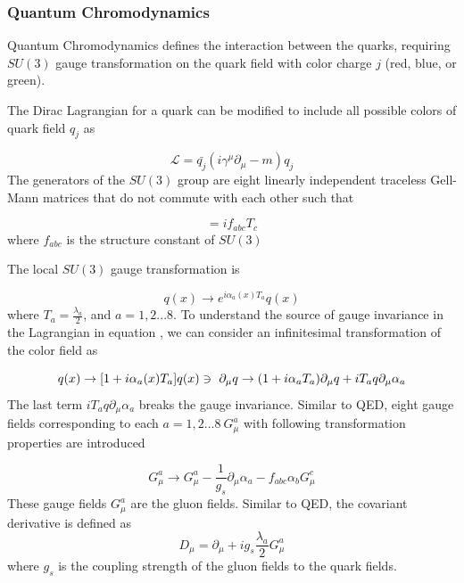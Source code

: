 \subsubsection{Quantum Chromodynamics }
\label{subsubsec:QCD}

Quantum Chromodynamics defines the interaction between the quarks, requiring $SU(3)$ gauge transformation on the quark field with color charge $j$ (red, blue, or green).
 
The Dirac Lagrangian for a quark can be modified to include all possible colors of quark field $q_{j}$ as

\begin{equation}
\mathcal{L} = \bar{q_{j}}(i\gamma^{\mu}\partial_{\mu} - m )q_{j}
\label{eqn:QCDStartL}
\end{equation}
The generators of the $SU(3)$ group are eight linearly independent traceless Gell-Mann matrices that do not commute with each other such that 

\begin{equation}
[ T_{a},T_{b} ] = if_{abc}T_{c}
\label{eqn:SU3GellManMat}
\end{equation}
where $f_{abc}$ is the structure constant of $SU(3)$

The local $SU(3)$ gauge transformation is 

\begin{equation}
q(x) \rightarrow e^{i \alpha_a(x) T_{a}} q(x)
\label{eqn:QCDSU3LT}
\end{equation}
where $T_{a} = \frac{\lambda_{a}}{2}$, and $a = {1,2...8}$. To understand the source of gauge invariance in the Lagrangian in equation \label{eqn:SU3LocalGaugeTransform}, we can consider an infinitesimal transformation of the color field as 

\begin{equation}
q(x) \rightarrow [ 1 + i\alpha_{a}(x)T_{a}]q(x) \\
\ni ~ \partial_{\mu}q \rightarrow ( 1 + i\alpha_{a}T_{a})\partial_{\mu}q + iT_{a}q\partial_{\mu} \alpha_{a}
\end{equation}
The last term $iT_{a}q\partial_{\mu} \alpha_{a}$ breaks the gauge invariance. Similar to QED, eight gauge fields corresponding to each $a = {1,2...8} ~ G_{\mu}^{a}$ with following transformation properties are introduced 

\begin{equation}
G_{\mu}^{a} \rightarrow G_{\mu}^{a} - \frac{1}{g_{s}} \partial_{\mu} \alpha_{a} - f_{abc}\alpha_{b}G^{c}_{\mu}
\label{eqn:SU3GaugeField}
\end{equation}
These gauge fields $G_{\mu}^{a}$ are the gluon fields. Similar to QED, the covariant derivative is defined as
\begin{equation}
D_{\mu} = \partial_{\mu} + ig_{s}\frac{\lambda_{a}}{2}G_{\mu}^{a} 
\label{eqn:SU3CovDerv}
\end{equation}
where $g_{s}$ is the coupling strength of the gluon fields to the quark fields.

